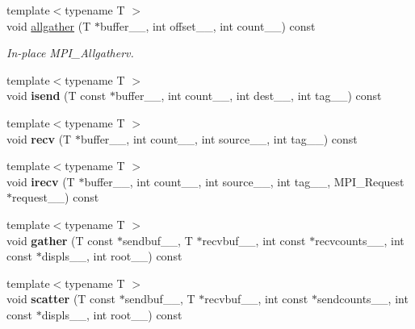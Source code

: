 \begin{DoxyCompactItemize}
\item 
{\footnotesize template$<$typename T $>$ }\\void \hyperlink{classsddk_1_1_communicator_a6de3e1e867bdbbbeda3a447ed2fe5ef8}{allgather} (T $\ast$buffer\+\_\+\+\_\+, int offset\+\_\+\+\_\+, int count\+\_\+\+\_\+) const 
\begin{DoxyCompactList}\small\item\em In-\/place M\+P\+I\+\_\+\+Allgatherv. \end{DoxyCompactList}\item 
\hypertarget{classsddk_1_1_communicator_a21f92a62a3cc4ef4c2d740a6e152b09e}{}{\footnotesize template$<$typename T $>$ }\\void {\bfseries isend} (T const $\ast$buffer\+\_\+\+\_\+, int count\+\_\+\+\_\+, int dest\+\_\+\+\_\+, int tag\+\_\+\+\_\+) const \label{classsddk_1_1_communicator_a21f92a62a3cc4ef4c2d740a6e152b09e}

\item 
\hypertarget{classsddk_1_1_communicator_af417ac53239b8fb4cf6d3bc0d3901d56}{}{\footnotesize template$<$typename T $>$ }\\void {\bfseries recv} (T $\ast$buffer\+\_\+\+\_\+, int count\+\_\+\+\_\+, int source\+\_\+\+\_\+, int tag\+\_\+\+\_\+) const \label{classsddk_1_1_communicator_af417ac53239b8fb4cf6d3bc0d3901d56}

\item 
\hypertarget{classsddk_1_1_communicator_ae98fc39d660193f191ae41fe033d422e}{}{\footnotesize template$<$typename T $>$ }\\void {\bfseries irecv} (T $\ast$buffer\+\_\+\+\_\+, int count\+\_\+\+\_\+, int source\+\_\+\+\_\+, int tag\+\_\+\+\_\+, M\+P\+I\+\_\+\+Request $\ast$request\+\_\+\+\_\+) const \label{classsddk_1_1_communicator_ae98fc39d660193f191ae41fe033d422e}

\item 
\hypertarget{classsddk_1_1_communicator_a2e7e248dfd73e8387bc2006552cc9c3b}{}{\footnotesize template$<$typename T $>$ }\\void {\bfseries gather} (T const $\ast$sendbuf\+\_\+\+\_\+, T $\ast$recvbuf\+\_\+\+\_\+, int const $\ast$recvcounts\+\_\+\+\_\+, int const $\ast$displs\+\_\+\+\_\+, int root\+\_\+\+\_\+) const \label{classsddk_1_1_communicator_a2e7e248dfd73e8387bc2006552cc9c3b}

\item 
\hypertarget{classsddk_1_1_communicator_aba847923e7f05ae42bdcb839b84ad6a6}{}{\footnotesize template$<$typename T $>$ }\\void {\bfseries scatter} (T const $\ast$sendbuf\+\_\+\+\_\+, T $\ast$recvbuf\+\_\+\+\_\+, int const $\ast$sendcounts\+\_\+\+\_\+, int const $\ast$displs\+\_\+\+\_\+, int root\+\_\+\+\_\+) const \label{classsddk_1_1_communicator_aba847923e7f05ae42bdcb839b84ad6a6}


\end{DoxyCompactItemize}
